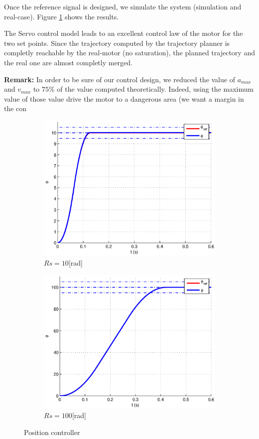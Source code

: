 Once the reference signal is designed, we simulate the system (simulation and real-case). Figure \ref{resultModelfollowing} shows the results.
 
The Servo control model leads to an excellent control law of the motor for the two set points. Since the trajectory computed by the trajectory planner is completly reachable by the real-motor (no saturation), the planned trajectory and the real one are almost completly merged.

\textbf{Remark:} In order to be sure of our control design, we reduced the value of $a_{max}$ and $v_{max}$ to $75\%$ of the value computed theoretically. Indeed, using the maximum value of those value drive the motor to a dangerous area (we want a margin in the con

\begin{figure}[ht]
  \centering
  \begin{subfigure}[b]{\linewidth}
   \includegraphics[width=\columnwidth]{fig/resultModelControl10.eps}
   \caption{$Rs = 10$[rad]}
  \end{subfigure}
  \begin{subfigure}[b]{\linewidth}
  \includegraphics[width=\columnwidth]{fig/resultModelControl100.eps}
   \caption{$Rs = 100$[rad]}
  \end{subfigure}

 \caption{Position controller}
 \label{resultModelfollowing}
\end{figure}



